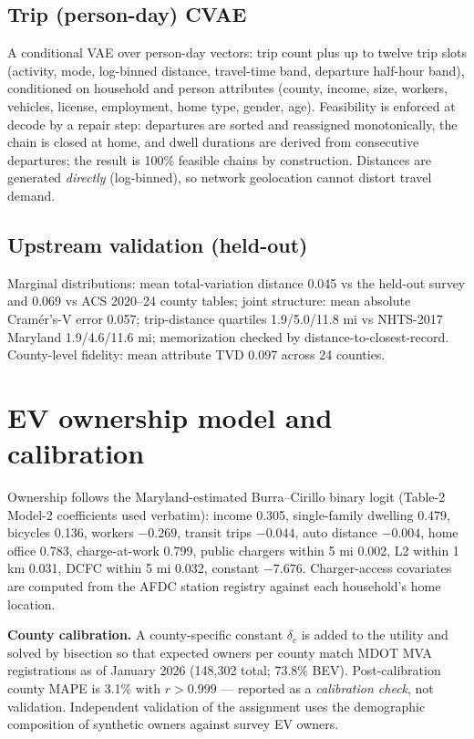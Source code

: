 \documentclass[11pt]{article}
\begin{document}
\subsection{Trip (person-day) CVAE}
A conditional VAE over person-day vectors: trip count plus up to twelve trip slots
(activity, mode, log-binned distance, travel-time band, departure half-hour band),
conditioned on household and person attributes (county, income, size, workers,
vehicles, license, employment, home type, gender, age). Feasibility is enforced at
decode by a repair step: departures are sorted and reassigned monotonically, the
chain is closed at home, and dwell durations are derived from consecutive
departures; the result is 100\% feasible chains by construction. Distances are
generated \emph{directly} (log-binned), so network geolocation cannot distort
travel demand.

\subsection{Upstream validation (held-out)}
Marginal distributions: mean total-variation distance 0.045 vs the held-out survey
and 0.069 vs ACS 2020--24 county tables; joint structure: mean absolute
Cram\'er's-V error 0.057; trip-distance quartiles 1.9/5.0/11.8 mi vs NHTS-2017
Maryland 1.9/4.6/11.6 mi; memorization checked by distance-to-closest-record.
County-level fidelity: mean attribute TVD 0.097 across 24 counties.

\section{EV ownership model and calibration}
\label{sec:own}
Ownership follows the Maryland-estimated Burra--Cirillo binary logit (Table-2
Model-2 coefficients used verbatim): income 0.305, single-family dwelling 0.479,
bicycles 0.136, workers $-0.269$, transit trips $-0.044$, auto distance $-0.004$,
home office 0.783, charge-at-work 0.799, public chargers within 5 mi 0.002, L2
within 1 km 0.031, DCFC within 5 mi 0.032, constant $-7.676$. Charger-access
covariates are computed from the AFDC station registry against each household's
home location.

\textbf{County calibration.} A county-specific constant $\delta_c$ is added to the
utility and solved by bisection so that expected owners per county match MDOT MVA
registrations as of January 2026 (148{,}302 total; 73.8\% BEV). Post-calibration
county MAPE is 3.1\% with $r>0.999$ --- reported as a \emph{calibration check},
not validation. Independent validation of the assignment uses the demographic
composition of synthetic owners against survey EV owners.
\end{document}
